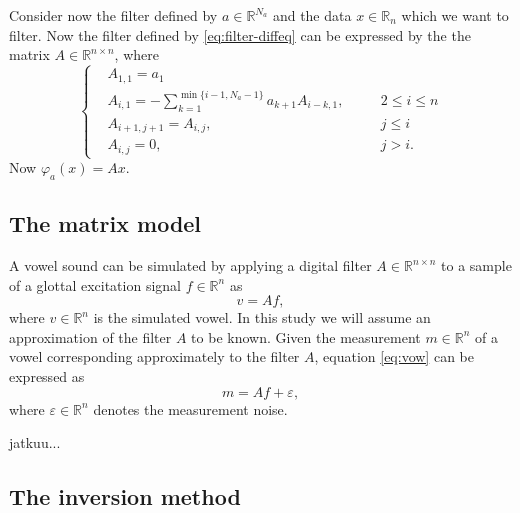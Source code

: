\documentclass[12pt,a4]{article}
\newcommand{\R}{{\mathbb R}}
\newcommand{\eps}{\ensuremath{\varepsilon}}
\begin{document}
Consider now the filter defined by $a \in \R^{N_a}$ and the data $x \in \R_n$ which we want to filter. Now the filter defined by \eqref{eq:filter-diffeq} can be expressed by the the matrix $A \in \R^{n \times n}$, where
\begin{equation}
\left\{
\begin{alignedat}{3}
   &A_{1,1}     = a_1 \\
   &A_{i,1}     = - \sum_{k=1}^{\min\{ i-1, N_a-1 \}} a_{k+1} A_{i-k,1}, \quad && 2 \leq i \leq n \\
   &A_{i+1,j+1} = A_{i,j},     && j \leq i \\
   &A_{i,j}     = 0,           && j > i .
\end{alignedat}
\right.
\end{equation}
Now $\varphi_a (x) = Ax$.


\subsection{The matrix model}
\label{sec:matrixModel}

A vowel sound can be simulated by applying a digital filter $A\in\R^{n \times n}$ to a sample of a glottal excitation signal $f \in \R^n$ as
\begin{equation}
\label{eq:vow}
v = A f,
\end{equation}
where $v \in \R^n$ is the simulated vowel. In this study we will assume an approximation of the filter $A$ to be known. Given the measurement $m \in \R^n$ of a vowel corresponding approximately to the filter $A$, equation \eqref{eq:vow} can be expressed as
\begin{equation}
\label{eq:vowModel}
m = A f + \eps,
\end{equation}
where $\eps \in \R^n$ denotes the measurement noise.

jatkuu...

\subsection{The inversion method}\label{sec:invMethod}
\end{document}
